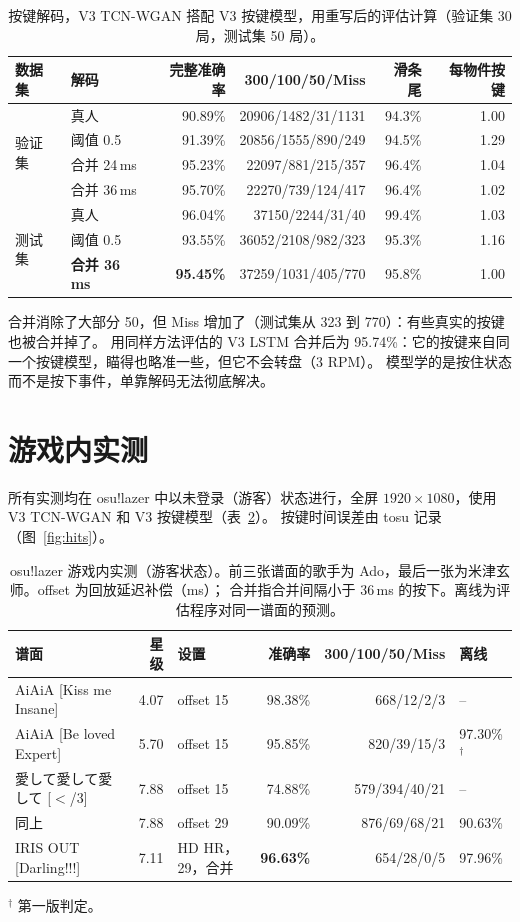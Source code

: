 \documentclass[11pt,a4paper,fontset=windows]{ctexart}
\begin{document}
\begin{table}[t]
\centering
\caption{按键解码，V3 TCN-WGAN 搭配 V3 按键模型，用重写后的评估计算（验证集 30 局，测试集 50 局）。}
\label{tab:keys}
\small
\begin{tabular}{llrrrr}
\toprule
数据集 & 解码 & 完整准确率 & 300/100/50/Miss & 滑条尾 & 每物件按键 \\
\midrule
\multirow{4}{*}{验证集} & 真人 & 90.89\% & 20906/1482/31/1131 & 94.3\% & 1.00 \\
 & 阈值 0.5 & 91.39\% & 20856/1555/890/249 & 94.5\% & 1.29 \\
 & 合并 24\,ms & 95.23\% & 22097/881/215/357 & 96.4\% & 1.04 \\
 & 合并 36\,ms & 95.70\% & 22270/739/124/417 & 96.4\% & 1.02 \\
\midrule
\multirow{3}{*}{测试集} & 真人 & 96.04\% & 37150/2244/31/40 & 99.4\% & 1.03 \\
 & 阈值 0.5 & 93.55\% & 36052/2108/982/323 & 95.3\% & 1.16 \\
 & \textbf{合并 36\,ms} & \textbf{95.45\%} & 37259/1031/405/770 & 95.8\% & 1.00 \\
\bottomrule
\end{tabular}
\end{table}

合并消除了大部分 50，但 Miss 增加了（测试集从 323 到 770）：有些真实的按键也被合并掉了。
用同样方法评估的 V3 LSTM 合并后为 95.74\%：它的按键来自同一个按键模型，瞄得也略准一些，但它不会转盘（3 RPM）。
模型学的是按住状态而不是按下事件，单靠解码无法彻底解决。

\section{游戏内实测}
所有实测均在 osu!lazer 中以未登录（游客）状态进行，全屏 $1920\times1080$，使用 V3 TCN-WGAN 和 V3 按键模型（表~\ref{tab:ingame}）。
按键时间误差由 tosu 记录（图~\ref{fig:hits}）。

\begin{table}[t]
\centering
\caption{osu!lazer 游戏内实测（游客状态）。前三张谱面的歌手为 Ado，最后一张为米津玄师。offset 为回放延迟补偿（ms）；
合并指合并间隔小于 36\,ms 的按下。离线为评估程序对同一谱面的预测。}
\label{tab:ingame}
\small
\begin{tabular}{lrlrrl}
\toprule
谱面 & 星级 & 设置 & 准确率 & 300/100/50/Miss & 离线 \\
\midrule
AiAiA [Kiss me Insane] & 4.07 & offset 15 & 98.38\% & 668/12/2/3 & -- \\
AiAiA [Be loved Expert] & 5.70 & offset 15 & 95.85\% & 820/39/15/3 & 97.30\%$^\dagger$ \\
愛して愛して愛して [$<$/3] & 7.88 & offset 15 & 74.88\% & 579/394/40/21 & -- \\
\quad 同上 & 7.88 & offset 29 & 90.09\% & 876/69/68/21 & 90.63\% \\
IRIS OUT [Darling!!!] & 7.11 & HD HR，29，合并 & \textbf{96.63\%} & 654/28/0/5 & 97.96\% \\
\bottomrule
\end{tabular}

\raggedright\footnotesize $^\dagger$ 第一版判定。
\end{table}
\end{document}
